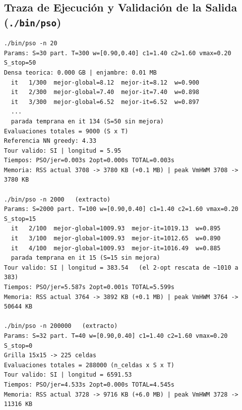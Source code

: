 \documentclass[11pt,a4paper]{article}
\begin{document}
\subsection{Traza de Ejecución y Validación de la Salida (\texttt{./bin/pso})}
\begin{lstlisting}
./bin/pso -n 20
Params: S=30 part. T=300 w=[0.90,0.40] c1=1.40 c2=1.60 vmax=0.20 S_stop=50
Densa teorica: 0.000 GB | enjambre: 0.01 MB
  it   1/300  mejor-global=8.12  mejor-it=8.12  w=0.900
  it   2/300  mejor-global=7.40  mejor-it=7.40  w=0.898
  it   3/300  mejor-global=6.52  mejor-it=6.52  w=0.897
  ...
  parada temprana en it 134 (S=50 sin mejora)
Evaluaciones totales = 9000 (S x T)
Referencia NN greedy: 4.33
Tour valido: SI | longitud = 5.95
Tiempos: PSO/jer=0.003s 2opt=0.000s TOTAL=0.003s
Memoria: RSS actual 3708 -> 3780 KB (+0.1 MB) | peak VmHWM 3708 -> 3780 KB

./bin/pso -n 2000   (extracto)
Params: S=2000 part. T=100 w=[0.90,0.40] c1=1.40 c2=1.60 vmax=0.20 S_stop=15
  it   2/100  mejor-global=1009.93  mejor-it=1019.13  w=0.895
  it   3/100  mejor-global=1009.93  mejor-it=1012.65  w=0.890
  it   4/100  mejor-global=1009.93  mejor-it=1016.49  w=0.885
  parada temprana en it 15 (S=15 sin mejora)
Tour valido: SI | longitud = 383.54   (el 2-opt rescata de ~1010 a 383)
Tiempos: PSO/jer=5.587s 2opt=0.001s TOTAL=5.599s
Memoria: RSS actual 3764 -> 3892 KB (+0.1 MB) | peak VmHWM 3764 -> 50644 KB

./bin/pso -n 200000   (extracto)
Params: S=32 part. T=40 w=[0.90,0.40] c1=1.40 c2=1.60 vmax=0.20 S_stop=0
Grilla 15x15 -> 225 celdas
Evaluaciones totales = 288000 (n_celdas x S x T)
Tour valido: SI | longitud = 6591.53
Tiempos: PSO/jer=4.533s 2opt=0.000s TOTAL=4.545s
Memoria: RSS actual 3728 -> 9716 KB (+6.0 MB) | peak VmHWM 3728 -> 11316 KB
\end{lstlisting}
\end{document}

